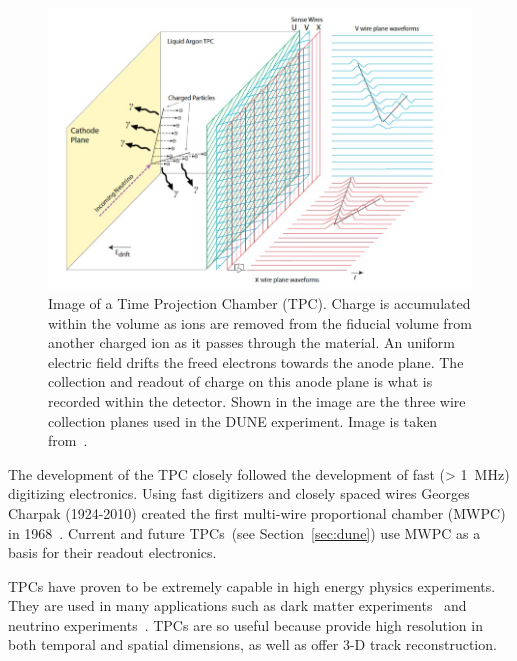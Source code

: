 \begin{figure}[]
\centering
\includegraphics[width=\textwidth]{images/dune_tdrv12020_lartpc-sp.jpg}
\caption{Image of a Time Projection Chamber (TPC).
Charge is accumulated within the volume as ions are removed from the fiducial volume from another charged ion as it passes through the material.
An uniform electric field drifts the freed electrons towards the anode plane.
The collection and readout of charge on this anode plane is what is recorded within the detector.
Shown in the image are the three wire collection planes used in the DUNE experiment.
Image is taken from~\citep{DUNE_TDR_V1_Abi_2020}.}
\label{fig:dune_apa}
\end{figure}

The development of the TPC closely followed the development of fast (> 1~\unit{MHz}) digitizing electronics.
Using fast digitizers and closely spaced wires Georges Charpak (1924-2010) created the first multi-wire proportional chamber (MWPC) in 1968~\citep{Charpak:1968kd}.
Current and future TPCs~(see Section~\ref{sec:dune}) use MWPC as a basis for their readout electronics.

TPCs have proven to be extremely capable in high energy physics experiments.
They are used in many applications such as dark matter experiments~\citep{Aprile_2017_xenon1T} and neutrino experiments~\citep{MicroBooNE_Acciarri_2017}.
TPCs are so useful because provide high resolution in both temporal and spatial dimensions, as well as offer 3-D track reconstruction.


